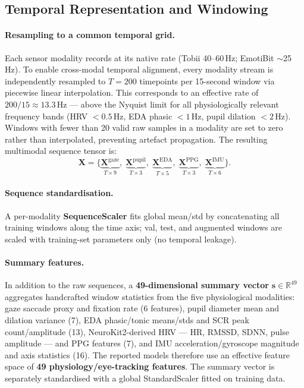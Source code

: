 \documentclass[sigconf,review,anonymous]{acmart}
\begin{document}
\subsection{Temporal Representation and Windowing}
\label{sec:temporal_repr}

\paragraph{Resampling to a common temporal grid.}
Each sensor modality records at its native rate (Tobii 40--60\,Hz;
EmotiBit $\sim$25\,Hz).
To enable cross-modal temporal alignment, every modality stream is
independently resampled to $T = 200$ timepoints per 15-second window
via piecewise linear interpolation.
This corresponds to an effective rate of $200/15 \approx 13.3$\,Hz ---
above the Nyquist limit for all physiologically relevant frequency bands
(HRV $< 0.5$\,Hz, EDA phasic $< 1$\,Hz, pupil dilation $< 2$\,Hz).
Windows with fewer than 20 valid raw samples in a modality are set to
zero rather than interpolated, preventing artefact propagation.
The resulting multimodal sequence tensor is:
\begin{equation}
  \mathbf{X} = \bigl\{
    \underbrace{\mathbf{X}^{\text{gaze}}}_{T\times 9},\;
    \underbrace{\mathbf{X}^{\text{pupil}}}_{T\times 3},\;
    \underbrace{\mathbf{X}^{\text{EDA}}}_{T\times 5},\;
    \underbrace{\mathbf{X}^{\text{PPG}}}_{T\times 3},\;
    \underbrace{\mathbf{X}^{\text{IMU}}}_{T\times 6}
  \bigr\}.
\end{equation}

\paragraph{Sequence standardisation.}
A per-modality \textbf{SequenceScaler} fits global mean/std by concatenating
all training windows along the time axis; val, test, and augmented windows are
scaled with training-set parameters only (no temporal leakage).

\paragraph{Summary features.}
In addition to the raw sequences, a \textbf{49-dimensional summary vector}
$\mathbf{s} \in \mathbb{R}^{49}$ aggregates handcrafted window statistics
from the five physiological modalities:
gaze saccade proxy and fixation rate (6 features),
pupil diameter mean and dilation variance (7),
EDA phasic/tonic means/stds and SCR peak count/amplitude (13),
NeuroKit2-derived HRV --- HR, RMSSD, SDNN, pulse amplitude --- and PPG features (7),
and IMU acceleration/gyroscope magnitude and axis statistics (16).
The reported models therefore use an effective feature space of
\textbf{49 physiology/eye-tracking features}.
The summary vector is separately standardised with a global
StandardScaler fitted on training data.
\end{document}
